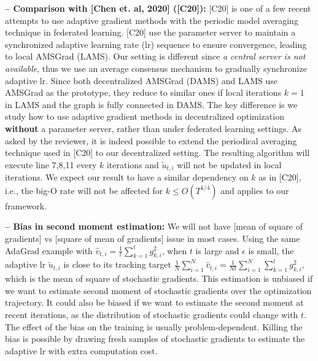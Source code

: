 \documentclass{article} %
\begin{document}
\textbf{-- Comparison with [Chen et. al, 2020] ([C20]):} 
[C20] is one of a few recent attempts to use adaptive gradient methods with the periodic model averaging technique in federated learning. 
[C20] use the parameter server to maintain a synchronized adaptive learning rate (lr) sequence to ensure convergence, leading to local AMSGrad (LAMS). 
Our setting is different since \emph{a central server is not available}, thus we use an average consensus mechanism to gradually synchronize adaptive lr. 
Since both decentralized AMSGrad (DAMS) and LAMS use AMSGrad as the prototype, they reduce to similar ones if local iterations $k=1$ in LAMS and the graph is fully connected in DAMS. 
The key difference is we study how to use adaptive gradient methods in decentralized optimization \textbf{without} a parameter server, rather than under federated learning settings. 
As asked by the reviewer, it is indeed possible to extend the periodical averaging technique used in [C20] to our decentralized setting. 
The resulting algorithm will execute line 7,8,11 every $k$ iterations and $\tilde {u}_{t,i}$ will not be updated in local iterations. 
We expect our result to have a similar dependency on $k$ as in [C20], i.e., the big-O rate will not be affected for $k \leq O(T^{1/4})$ and applies to our framework. 

 \vspace{-2pt}
\textbf{-- Bias in second moment estimation:} We will not have [mean of square of gradients] vs [square of mean of gradients] issue in most cases. 
Using the same AdaGrad example with $\hat v_{t,i} = \frac{1}{t}\sum_{k=1}^t g_{k,i}^2$, when $t$ is large and $\epsilon$ is small, the adaptive lr $\tilde{u}_{t,i}$ is close to its tracking target $\frac{1}{N} \sum_{i=1}^N\hat v_{t,i} = \frac{1}{Nt} \sum_{i=1}^N\sum_{k=1}^t g_{k,i}^2$, which is the mean of square of stochastic gradients. This estimation is unbiased 
if we want to estimate second moment of stochastic gradients over the optimization trajectory. 
It could also be biased if we want to estimate the second moment at recent iterations, as the distribution of stochastic gradients could change with $t$. 
The effect of the bias on the training is usually problem-dependent. 
Killing the bias is possible by drawing fresh samples of stochastic gradients to estimate the adaptive lr with extra computation cost. %
\end{document}
